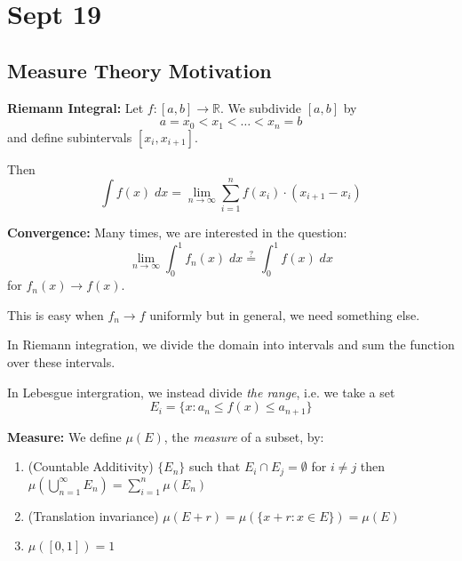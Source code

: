 \documentclass[12pt]{report}
\newcommand{\R}{\mathbb{R}}
\begin{document}
\section{Sept 19}
    \subsection*{Measure Theory Motivation}
        \textbf{Riemann Integral:} Let $f: [a, b] \to \R$. We subdivide $[a, b]$ by 
        \[a = x_0 < x_1 < \dots < x_n = b\]
        and define subintervals $[x_i, x_{i+1}]$. 

        Then 
        \[\int f(x) \;dx = \lim_{n \to \infty}\sum_{i = 1}^{n} f(x_i)\cdot (x_{i+1} - x_i)\]

        \textbf{Convergence:} Many times, we are interested in the question: 
        \[\lim_{n \to \infty} \int_0^1 f_n(x)\; dx \overset{?}{=} \int_0^1 f(x)\; dx\]
        for $f_n(x) \to f(x)$. 

        This is easy when $f_n \to f$ uniformly but in general, we need something else. 

        In Riemann integration, we divide the domain into intervals and sum the function over these intervals.

        In Lebesgue intergration, we instead divide \emph{the range}, i.e. we take a set 
        \[E_i = \{x: a_n \leq f(x)\leq a_{n+1}\}\] 

        \textbf{Measure:} We define $\mu(E)$, the \emph{measure} of a subset, by:
        \begin{enumerate}
            \item (Countable Additivity) $\{E_n\}$ such that $E_i \cap E_j = \emptyset$ for $i \neq j$ then $\mu(\bigcup_{n=1}^{\infty} E_n) = \sum_{i=1}^n \mu(E_n)$
            \item (Translation invariance) $\mu(E + r) = \mu(\{x + r: x \in E\})= \mu(E)$
            \item $\mu([0,1]) = 1$
        \end{enumerate} 
\end{document}
